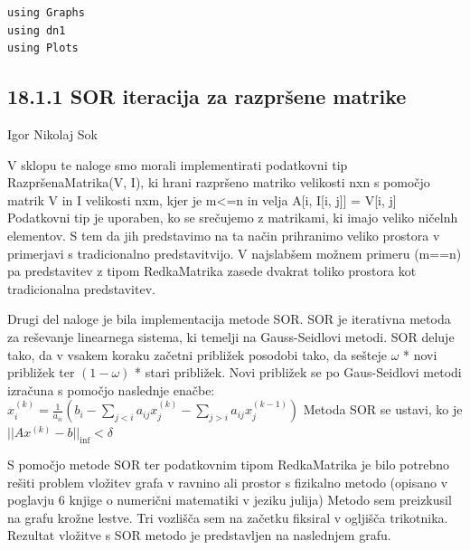 \documentclass[12pt,a4paper]{article}
\begin{document}
\begin{verbatim}
using Graphs
using dn1
using Plots
\end{verbatim}

\subsection{18.1.1 SOR iteracija za razpršene matrike}

Igor Nikolaj Sok


V sklopu te naloge smo morali implementirati podatkovni tip RazpršenaMatrika(V, I), ki hrani razpršeno matriko velikosti nxn s pomočjo matrik V in I velikosti nxm, kjer je m<=n in velja A[i, I[i, j]] = V[i, j] Podatkovni tip je uporaben, ko se srečujemo z matrikami, ki imajo veliko ničelnh elementov. S tem da jih predstavimo na ta način prihranimo veliko prostora v primerjavi s tradicionalno predstavitvijo. V najslabšem možnem primeru (m==n) pa predstavitev z tipom RedkaMatrika zasede dvakrat toliko prostora kot tradicionalna predstavitev. 


Drugi del naloge je bila implementacija metode SOR. SOR je iterativna metoda za reševanje linearnega sistema, ki temelji na Gauss-Seidlovi metodi. SOR deluje tako, da v vsakem koraku začetni približek posodobi tako, da sešteje $\omega$ * novi približek ter $(1- \omega)$ * stari približek. Novi približek se po Gaus-Seidlovi metodi izračuna s pomočjo naslednje enačbe: $x_i^{(k)} = \frac{1}{a_{ii}} (b_i - \sum_{j<i} a_{ij} x_j^{(k)} - \sum_{j>i} a_{ij} x_j^{(k-1)})$ Metoda SOR se ustavi, ko je $||Ax^{(k)} - b||_{\inf} < \delta$


S pomočjo metode SOR ter podatkovnim tipom RedkaMatrika je bilo potrebno rešiti problem vložitev grafa v ravnino ali prostor s fizikalno metodo (opisano v poglavju 6 knjige o numerični matematiki v jeziku julija) Metodo sem preizkusil na grafu krožne lestve. Tri vozlišča sem na začetku fiksiral v ogljišča trikotnika. Rezultat vložitve s SOR metodo je predstavljen na naslednjem grafu.
\end{document}
